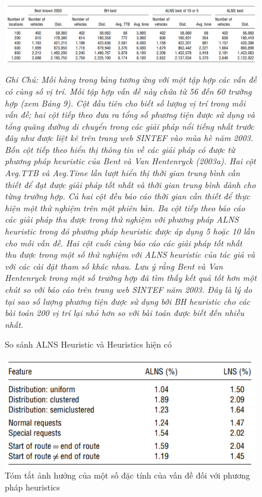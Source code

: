 \begin{center}
    \begin{figure}[htp]
    \caption{So sánh ALNS Heuristic và Heuristics hiện có}        
    \begin{center}
     \includegraphics[scale=.5]{figures/Thuy_table7}
    \end{center}
  \textit{Ghi Chú: Mỗi hàng trong bảng tương ứng với một tập hợp các vấn đề có cùng số vị trí. Mỗi tập hợp vấn đề này chứa từ 56 đến 60 trường hợp (xem Bảng 9). Cột đầu tiên cho biết số lượng vị trí trong mỗi vấn đề; hai cột tiếp theo đưa ra tổng số phương tiện được sử dụng và tổng quãng đường di chuyển trong các giải pháp nổi tiếng nhất trước đây như được liệt kê trên trang web SINTEF vào mùa hè năm 2003. Bốn cột tiếp theo hiển thị thông tin về các giải pháp có được từ phương pháp heuristic của Bent và Van Hentenryck (2003a). Hai cột Avg.TTB và Avg.Time lần lượt hiển thị thời gian trung bình cần thiết để đạt được giải pháp tốt nhất và thời gian trung bình dành cho từng trường hợp. Cả hai cột đều báo cáo thời gian cần thiết để thực hiện một thử nghiệm trên một phiên bản. Ba cột tiếp theo báo cáo các giải pháp thu được trong thử nghiệm với phương pháp ALNS heuristic trong đó phương pháp heuristic được áp dụng 5 hoặc 10 lần cho mỗi vấn đề. Hai cột cuối cùng báo cáo các giải pháp tốt nhất thu được trong một số thử nghiệm với ALNS heuristic của tác giả và với các cài đặt tham số khác nhau. Lưu ý rằng Bent và Van Hentenryck trong một số trường hợp đã tìm thấy kết quả tốt hơn một chút so với báo cáo trên trang web SINTEF năm 2003. Đây là lý do tại sao số lượng phương tiện được sử dụng bởi BH heuristic cho các bài toán 200 vị trí lại nhỏ hơn so với bài toán được biết đến nhiều nhất.}
    \end{figure}
\end{center}


\begin{center}
    \begin{figure}[htp]
    \caption{Tóm tắt ảnh hưởng của một số đặc tính của vấn đề đối với phương pháp heuristics}        
    \begin{center}
     \includegraphics[scale=.5]{figures/Thuy_table8}
    \end{center}
    \end{figure}
\end{center}



